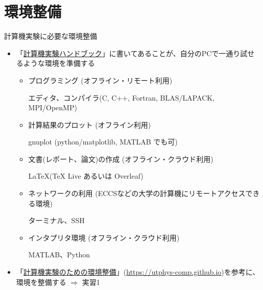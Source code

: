 \section{環境整備}

\begin{frame}[t,fragile]{計算機実験に必要な環境整備}
  \begin{itemize}
  \item 「\href{https://github.com/utphys-comp/handbook/releases/download/handbook-2024/handbook.pdf}{計算機実験ハンドブック}」に書いてあることが、自分のPCで一通り試せるような環境を準備する
    \begin{itemize}
    \item プログラミング (オフライン・リモート利用)

      エディタ、コンパイラ(C, C++, Fortran, BLAS/LAPACK, MPI/OpenMP)
    \item 計算結果のプロット (オフライン利用)

      gnuplot (python/matplotlib, MATLAB でも可)
    \item 文書(レポート、論文)の作成 (オフライン・クラウド利用)

      \LaTeX (TeX Live あるいは Overleaf)
    \item ネットワークの利用 (ECCSなどの大学の計算機にリモートアクセスできる環境)

      ターミナル、SSH
    \item インタプリタ環境 (オフライン・クラウド利用)

      MATLAB、Python
    \end{itemize}
  \item 「\href{https://utphys-comp.github.io}{計算機実験のための環境整備}」({\small \href{https://utphys-comp.github.io}{https://utphys-comp.github.io}})を参考に、環境を整備する $\Rightarrow$ 実習1
  \end{itemize}
\end{frame}
